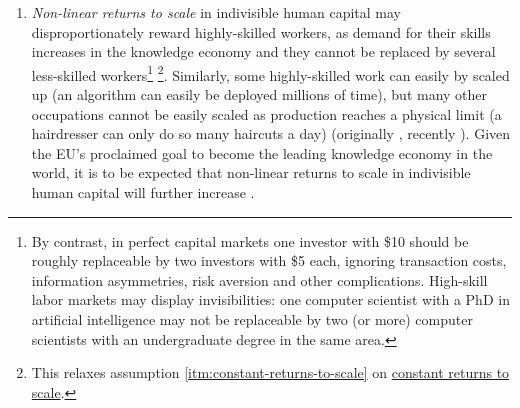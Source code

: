 \begin{enumerate}
	\item {} \label{itm:non-linear-returns} \emph{Non-linear returns to scale} in indivisible human capital may disproportionately reward highly-skilled workers, as demand for their skills increases in the knowledge economy and they cannot be replaced by several less-skilled workers\footnote{
		By contrast, in perfect capital markets one investor with \$10 should be roughly replaceable by two investors with \$5 each, ignoring transaction costs, information asymmetries, risk aversion and other complications. High-skill labor markets may display invisibilities: one computer scientist with a PhD in artificial intelligence may not be replaceable by two (or more) computer scientists with an undergraduate degree in the same area.} \footnote{
		This relaxes  assumption \ref{itm:constant-returns-to-scale} on \hyperref[itm:constant-returns-to-scale]{constant returns to scale}.}.
	Similarly, some highly-skilled work can easily by scaled up (an algorithm can  easily be deployed millions of time), but many other occupations cannot be easily scaled as production reaches a physical limit (a hairdresser can only do so many haircuts a day) (originally \citealt{Rosen1981}, recently \citealt{Taleb2007}). Given the \gls{EU}'s proclaimed goal to become the leading knowledge economy in the world, it is to be expected that non-linear returns to scale in indivisible human capital will further increase \citep{Commission2007}.
	

\end{enumerate}
